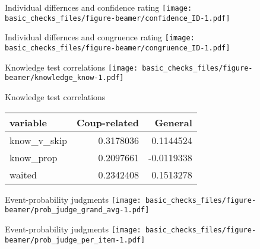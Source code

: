 \documentclass[
  ignorenonframetext,
]{beamer}
\begin{document}
\begin{frame}{Individual differnces and confidence rating}
\protect\hypertarget{individual-differnces-and-confidence-rating}{}
\texttt{[image: basic\_checks\_files/figure-beamer/confidence\_ID-1.pdf]}
\end{frame}

\begin{frame}{Individual differnces and congruence rating}
\protect\hypertarget{individual-differnces-and-congruence-rating}{}
\texttt{[image: basic\_checks\_files/figure-beamer/congruence\_ID-1.pdf]}
\end{frame}

\begin{frame}{Knowledge test correlations}
\protect\hypertarget{knowledge-test-correlations}{}
\texttt{[image: basic\_checks\_files/figure-beamer/knowledge\_know-1.pdf]}
\end{frame}

\begin{frame}{Knowledge test correlations}
\protect\hypertarget{knowledge-test-correlations-1}{}
\begin{longtable}[]{@{}lrr@{}}
\toprule()
variable & Coup-related & General \\
\midrule()
\endhead
know\_v\_skip & 0.3178036 & 0.1144524 \\
know\_prop & 0.2097661 & -0.0119338 \\
waited & 0.2342408 & 0.1513278 \\
\bottomrule()
\end{longtable}
\end{frame}

\begin{frame}{Event-probability judgments}
\protect\hypertarget{event-probability-judgments}{}
\texttt{[image: basic\_checks\_files/figure-beamer/prob\_judge\_grand\_avg-1.pdf]}
\end{frame}

\begin{frame}{Event-probability judgments}
\protect\hypertarget{event-probability-judgments-1}{}
\texttt{[image: basic\_checks\_files/figure-beamer/prob\_judge\_per\_item-1.pdf]}
\end{frame}
\end{document}
